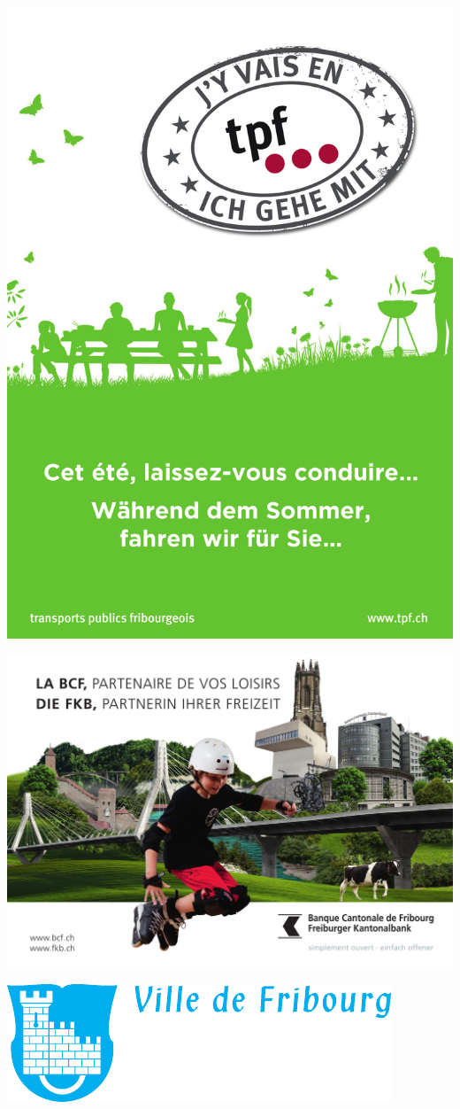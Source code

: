 {\centering
\includegraphics[width=\textwidth]{tpf2.jpg}
\par
}
\clearpage
\thispagestyle{empty}%
{\centering
\includegraphics[width=\textwidth]{bcf.jpg}
\par
\vspace*{20mm}
\vfill
\includegraphics[width=.8\textwidth]{ville.pdf}
\vfill
\par
}
